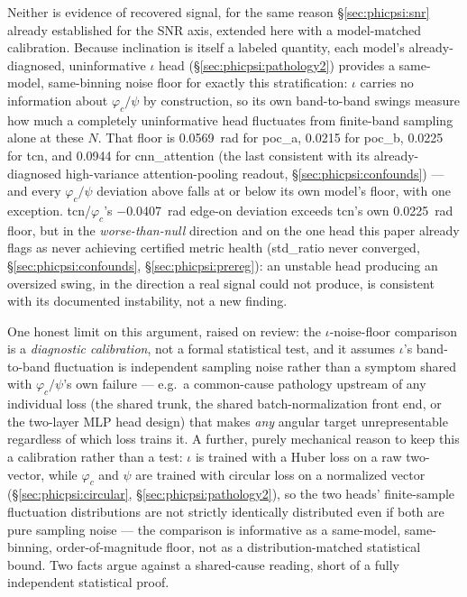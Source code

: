 Neither is evidence of recovered signal, for the same reason \S\ref{sec:phicpsi:snr} already established for the SNR axis, extended here with a model-matched calibration.
Because inclination is itself a labeled quantity, each model's already-diagnosed, uninformative $\iota$ head (\S\ref{sec:phicpsi:pathology2}) provides a same-model, same-binning noise floor for exactly this stratification: $\iota$ carries no information about $\varphi_c/\psi$ by construction, so its own band-to-band swings measure how much a completely uninformative head fluctuates from finite-band sampling alone at these $N$.
That floor is \SI{0.0569}{\radian} for poc\_a, \num{0.0215} for poc\_b, \num{0.0225} for tcn, and \num{0.0944} for cnn\_attention (the last consistent with its already-diagnosed high-variance attention-pooling readout, \S\ref{sec:phicpsi:confounds}) --- and every $\varphi_c/\psi$ deviation above falls at or below its own model's floor, with one exception.
tcn/$\varphi_c$'s $-{}$\SI{0.0407}{\radian} edge-on deviation exceeds tcn's own \SI{0.0225}{\radian} floor, but in the \emph{worse-than-null} direction and on the one head this paper already flags as never achieving certified metric health (std\_ratio never converged, \S\ref{sec:phicpsi:confounds}, \S\ref{sec:phicpsi:prereg}): an unstable head producing an oversized swing, in the direction a real signal could not produce, is consistent with its documented instability, not a new finding.

One honest limit on this argument, raised on review: the $\iota$-noise-floor comparison is a \emph{diagnostic calibration}, not a formal statistical test, and it assumes $\iota$'s band-to-band fluctuation is independent sampling noise rather than a symptom shared with $\varphi_c/\psi$'s own failure --- e.g.\ a common-cause pathology upstream of any individual loss (the shared trunk, the shared batch-normalization front end, or the two-layer MLP head design) that makes \emph{any} angular target unrepresentable regardless of which loss trains it.
A further, purely mechanical reason to keep this a calibration rather than a test: $\iota$ is trained with a Huber loss on a raw two-vector, while $\varphi_c$ and $\psi$ are trained with circular loss on a normalized vector (\S\ref{sec:phicpsi:circular}, \S\ref{sec:phicpsi:pathology2}), so the two heads' finite-sample fluctuation distributions are not strictly identically distributed even if both are pure sampling noise --- the comparison is informative as a same-model, same-binning, order-of-magnitude floor, not as a distribution-matched statistical bound.
Two facts argue against a shared-cause reading, short of a fully independent statistical proof.


